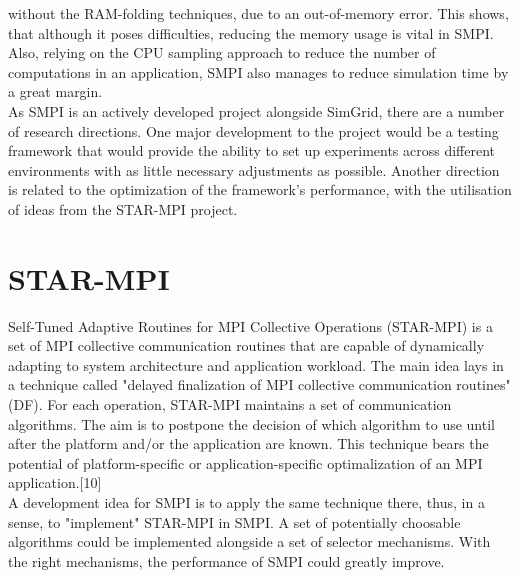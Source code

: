 without the RAM-folding techniques, due to an out-of-memory
error. This shows, that although it poses difficulties, reducing the
memory usage is vital in SMPI. Also, relying on the CPU sampling
approach to reduce the number of computations in an application, SMPI
also manages to reduce simulation time by a great margin.\\
As SMPI is an actively developed project alongside SimGrid, there are
a number of research directions. One major development to the
project would be a testing framework that would provide the ability to
set up experiments across different environments with as little
necessary adjustments as possible. Another direction is related to the
optimization of the framework's performance, with the utilisation of
ideas from the STAR-MPI project.
\section{STAR-MPI}
Self-Tuned Adaptive Routines for MPI Collective Operations (STAR-MPI)
is a set of MPI collective communication routines that are capable of
dynamically adapting to system architecture and application
workload. The main idea lays in a technique called "delayed
finalization of MPI collective communication routines" (DF). For each
operation, STAR-MPI maintains a set of communication algorithms. The
aim is to postpone the decision of which algorithm to use until after
the platform and/or the application are known. This technique bears
the potential of platform-specific or application-specific
optimalization of an MPI application.[10]\\
A development idea for SMPI is to apply the same technique there,
thus, in a sense, to "implement" STAR-MPI in SMPI. A set of
potentially choosable algorithms could be implemented alongside a set
of selector mechanisms. With the right mechanisms, the performance of
SMPI could greatly improve.
